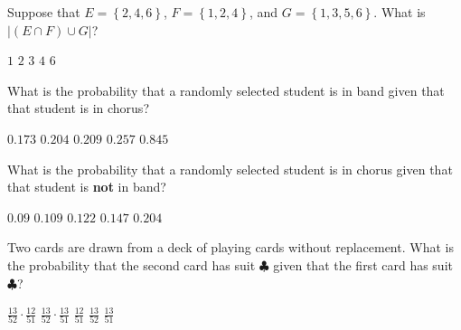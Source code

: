 \documentclass[12pt]{exam}
\begin{document}
\begin{questions}
\question Suppose that $E=\left\{2,4,6\right\}$,
$F=\left\{1,2,4\right\}$, and $G=\left\{1,3,5,6\right\}$.
What is $\left|\left(E\cap F\right)\cup G\right|$?\\
\begin{oneparchoices}
\choice $1$
\choice $2$
\choice $3$
\choice $4$
\correctchoice $6$
\end{oneparchoices}


\question\label{FirstAmes} What is the probability that a randomly selected
student is in band given that that student is in chorus?\\
\begin{oneparchoices}
\correctchoice $0.173$ 
\choice $0.204$ %
\choice $0.209$ %
\choice $0.257$ %
\choice $0.845$ %
\end{oneparchoices}

\question\label{LastAmes} What is the probability that a randomly selected
student is in chorus given that that student is {\bf not} in band?\\
\begin{oneparchoices}
\choice $0.09$ %
\correctchoice $0.109$
\choice $0.122$ %
\choice $0.147$ %
\choice $0.204$ %
\end{oneparchoices}

\question Two cards are drawn from a deck of playing cards
without replacement. What is the probability that
the second card has suit $\clubsuit$ given that the
first card has suit $\clubsuit$?\\
\begin{oneparchoices}
\choice $\frac{13}{52}\cdot\frac{12}{51}$
\choice $\frac{13}{52}\cdot\frac{13}{51}$
\correctchoice $\frac{12}{51}$
\choice $\frac{13}{52}$
\choice $\frac{13}{51}$
\end{oneparchoices}

\end{questions}
\end{document}
